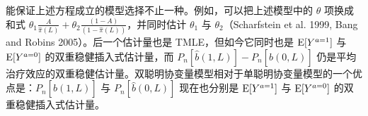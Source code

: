 \begin{techpoint}[增广 IP 加权估计量与双重稳健插入式估计量的关系]
能保证上述方程成立的模型选择不止一种。例如，可以把上述模型中的 $\theta$ 项换成和式 $\theta_1\frac{A}{\hat\pi(L)}+\theta_2\frac{(1-A)}{(1-\hat\pi(L))}$，并同时估计 $\theta_1$ 与 $\theta_2$（Scharfstein et al. 1999, Bang and Robins 2005）。后一个估计量也是 TMLE，但如今它同时也是 $\mathrm{E}[Y^{a=1}]$ 与 $\mathrm{E}[Y^{a=0}]$ 的双重稳健插入式估计量，而 $P_n[\hat b(1,L)]-P_n[\hat b(0,L)]$ 仍是平均治疗效应的双重稳健估计量。双聪明协变量模型相对于单聪明协变量模型的一个优点是：$P_n[\hat b(1,L)]$ 与 $P_n[\hat b(0,L)]$ 现在也分别是 $\mathrm{E}[Y^{a=1}]$ 与 $\mathrm{E}[Y^{a=0}]$ 的双重稳健插入式估计量。
\end{techpoint}
\renewcommand{\TPname}{技术注记}
